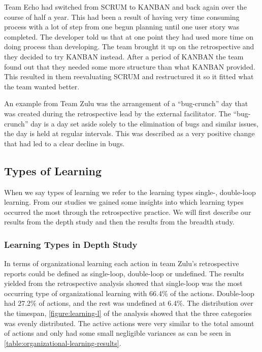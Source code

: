 Team Echo had switched from SCRUM to KANBAN and back again over the course of half a year. This had been a result of having very time consuming process with a lot of step from one begun planning until one user story was completed. The developer told us that at one point they had used more time on doing process than developing. The team brought it up on the retrospective and they decided to try KANBAN instead. After a period of KANBAN the team found out that they needed some more structure than what KANBAN provided. This resulted in them reevaluating SCRUM and restructured it so it fitted what the team wanted better. 

An example from Team Zulu was the arrangement of a ``bug-crunch'' day that was created during the retrospective lead by the external facilitator. The ``bug-crunch'' day is a day set aside solely to the elimination of bugs and similar issues, the day is held at regular intervals. This was described as a very positive change that had led to a clear decline in bugs. 

\subsection{Types of Learning}
When we say types of learning we refer to the learning types single-, double-loop learning. From our studies we gained some insights into which learning types occurred the most through the retrospective practice. We will first describe our results from the depth study and then the results from the breadth study. 

\subsubsection{Learning Types in Depth Study}
In terms of organizational learning each action in team Zulu's retrospective reports could be defined as single-loop, double-loop or undefined. The results yielded from the retrospective analysis showed that single-loop was the most occurring type of organizational learning with 66.4\% of the actions. Double-loop had 27.2\% of actions, and the rest was undefined at 6.4\%. The distribution over the timespan, \autoref{figure:learning-l} of the analysis showed that the three categories was evenly distributed. The active actions were very similar to the total amount of actions and only had some small negligible variances as can be seen in \autoref{table:organizational-learning-results}.


